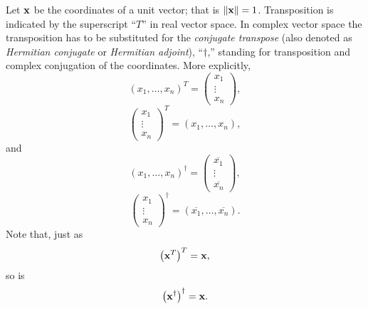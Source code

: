 Let ${\bf x}$ be the coordinates of a unit vector;
that is $\|{\bf x} \| =1$.
Transposition is indicated by the superscript ``$T$''
in real vector space.
In complex vector space the transposition has to be substituted
 for the {\em conjugate transpose} (also denoted as
{\em Hermitian conjugate} or {\em Hermitian adjoint}),
``$\dagger$,'' standing for transposition and complex conjugation of the coordinates.
More explicitly,
\begin{equation}(x_1,\ldots, x_n)^T=
\begin{pmatrix}
x_1\\ \vdots\\ x_n
\end{pmatrix}
,
\end{equation}
\begin{equation}
\begin{pmatrix}
x_1\\ \vdots\\ x_n
\end{pmatrix}^T
=
(x_1,\ldots, x_n)
,\end{equation}
and
\begin{equation} (x_1,\ldots, x_n)^\dagger =
\begin{pmatrix}
\overline{x_1}\\ \vdots\\ \overline{x_n}
\end{pmatrix}
,
\end{equation}
\begin{equation}
\begin{pmatrix}
x_1\\ \vdots\\ x_n
\end{pmatrix}^\dagger
= (\overline{x_1},\ldots, \overline{x_n})
.
\end{equation}
Note that, just as
\begin{equation}\left({\bf x}^T\right)^T={\bf x},
\end{equation}
 so is
\begin{equation}\left({\bf x}^\dagger \right)^\dagger={\bf x}.
\end{equation}

